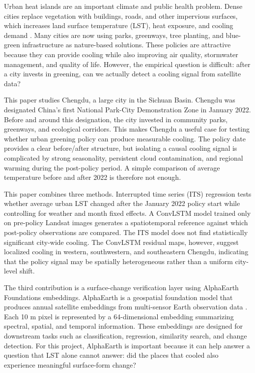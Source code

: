\documentclass{article}
\begin{document}
Urban heat islands are an important climate and public health problem. Dense
cities replace vegetation with buildings, roads, and other impervious surfaces,
which increases land surface temperature (LST), heat exposure, and cooling
demand \citep{Oke1982, Zhao2014}. Many cities are now using parks, greenways,
tree planting, and blue-green infrastructure as nature-based solutions. These
policies are attractive because they can provide cooling while also improving
air quality, stormwater management, and quality of life. However, the empirical
question is difficult: after a city invests in greening, can we actually detect
a cooling signal from satellite data?

This paper studies Chengdu, a large city in the Sichuan Basin. Chengdu was
designated China's first National Park-City Demonstration Zone in January 2022.
Before and around this designation, the city invested in community parks,
greenways, and ecological corridors. This makes Chengdu a useful case for
testing whether urban greening policy can produce measurable cooling. The
policy date provides a clear before/after structure, but isolating a causal
cooling signal is complicated by strong seasonality, persistent cloud
contamination, and regional warming during the post-policy period. A simple
comparison of average temperature before and after 2022 is therefore not enough.

This paper combines three methods. Interrupted time series (ITS) regression
tests whether average urban LST changed after the January 2022 policy start
while controlling for weather and month fixed effects. A ConvLSTM model trained
only on pre-policy Landsat images generates a spatiotemporal reference against
which post-policy observations are compared. The ITS model does not find
statistically significant city-wide cooling. The ConvLSTM residual maps,
however, suggest localized cooling in western, southwestern, and southeastern Chengdu,
indicating that the policy signal may be spatially heterogeneous rather than
a uniform city-level shift.

The third contribution is a surface-change verification layer using AlphaEarth
Foundations embeddings. AlphaEarth is a geospatial foundation model that
produces annual satellite
embeddings from multi-sensor Earth observation data \citep{Brown2025,
Google2025Catalog}. Each 10 m pixel is represented by a 64-dimensional
embedding summarizing spectral, spatial, and temporal information. These
embeddings are designed for downstream tasks such as classification, regression,
similarity search, and change detection. For this project, AlphaEarth is
important because it can help answer a question that LST alone cannot answer:
did the places that cooled also experience meaningful surface-form change?
\end{document}
